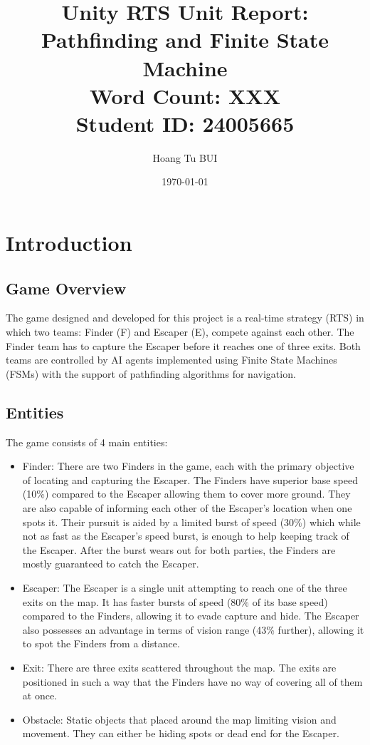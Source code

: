 \documentclass[a4paper,12pt]{article}
\title{Unity RTS Unit Report: Pathfinding and Finite State Machine
\\ \small Word Count: XXX 
\\ Student ID: 24005665}
\author{Hoang Tu BUI}
\date{\today}
\begin{document}
\maketitle
\tableofcontents
\newpage

\section{Introduction}


\subsection{Game Overview}
The game designed and developed for this project is a real-time strategy (RTS) in which two teams: Finder (F) and Escaper (E), compete against each other. 
The Finder team has to capture the Escaper before it reaches one of three exits.
Both teams are controlled by AI agents implemented using Finite State Machines (FSMs) with the support of pathfinding algorithms for navigation.


\subsection{Entities}
The game consists of 4 main entities:
\begin{itemize}
    \item Finder: 
    There are two Finders in the game, each with the primary objective of locating and capturing the Escaper.
    The Finders have superior base speed (10\%) compared to the Escaper allowing them to cover more ground.
    They are also capable of informing each other of the Escaper's location when one spots it.
    Their pursuit is aided by a limited burst of speed (30\%) which while not as fast as the Escaper's speed burst, is enough to help keeping track of the Escaper.
    After the burst wears out for both parties, the Finders are mostly guaranteed to catch the Escaper.
    
    \item Escaper: 
    The Escaper is a single unit attempting to reach one of the three exits on the map.
    It has faster bursts of speed (80\% of its base speed) compared to the Finders, allowing it to evade capture and hide.
    The Escaper also possesses an advantage in terms of vision range (43\% further), allowing it to spot the Finders from a distance.
    
    \item Exit: 
    There are three exits scattered throughout the map. 
    The exits are positioned in such a way that the Finders have no way of covering all of them at once.
    
    \item Obstacle: 
    Static objects that placed around the map limiting vision and movement. 
    They can either be hiding spots or dead end for the Escaper.
\end{itemize}
\end{document}

